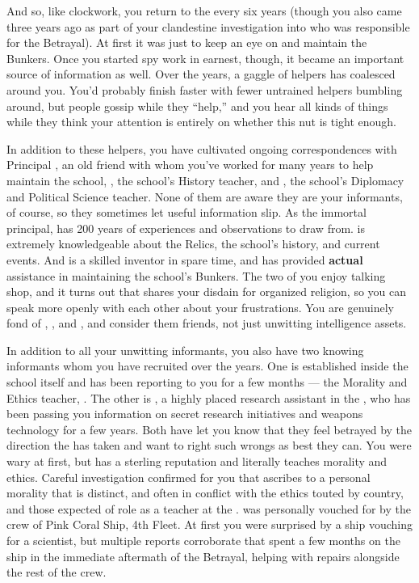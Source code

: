 \documentclass[char]{GL2020}
\begin{document}
And so, like clockwork, you return to the \pSchool{} every six years (though you also came three years ago as part of your clandestine investigation into who was responsible for the Betrayal). At first it was just to keep an eye on and maintain the Bunkers. Once you started spy work in earnest, though, it became an important source of information as well. Over the years, a gaggle of helpers has coalesced around you. You'd probably finish faster with fewer untrained helpers bumbling around, but people gossip while they ``help,'' and you hear all kinds of things while they think your attention is entirely on whether this nut is tight enough. 

In addition to these helpers, you have cultivated ongoing correspondences with Principal \cPrincipal{\full}, an old friend with whom you've worked for many years to help maintain the school, \cHistory{\full}, the school's History teacher, and \cChupInventor{\full}, the school’s Diplomacy and Political Science teacher. None of them are aware they are your informants, of course, so they sometimes let useful information slip. As the immortal principal, \cPrincipal{} has 200 years of experiences and observations to draw from. \cHistory{} is extremely knowledgeable about the Relics, the school's history, and current events. And \cChupInventor{} is a skilled inventor in \cChupInventor{\their} spare time, and has provided \textbf{actual} assistance in maintaining the school’s Bunkers. The two of you enjoy talking shop, and it turns out that \cChupInventor{} shares your disdain for organized religion, so you can speak more openly with each other about your frustrations. You are genuinely fond of \cPrincipal{}, \cHistory{}, and \cChupInventor{}, and consider them friends, not just unwitting intelligence assets. 

In addition to all your unwitting informants, you also have two knowing informants whom you have recruited over the years. One is established inside the school itself and has been reporting to you for a few months — the Morality and Ethics teacher, \cEthics{\full}. The other is \cAssistantScientist{\full}, a highly placed research assistant in the \pTech{}, who has been passing you information on secret research initiatives and weapons technology for a few years. Both have let you know that they feel betrayed by the direction the \pTech{} has taken and want to right such wrongs as best they can. You were wary at first, but \cEthics{} has a sterling reputation and literally teaches morality and ethics. Careful investigation confirmed for you that \cEthics{} ascribes to a personal morality that is distinct, and often in conflict with the ethics touted by \cEthics{\their} country, and those expected of \cEthics{\their} role as a teacher at the \pSc{}. \cAssistantScientist{} was personally vouched for by the crew of Pink Coral Ship, 4th Fleet. At first you were surprised by a \pShippie{} ship vouching for a \pTech{} scientist, but multiple reports corroborate that \cAssistantScientist{\they} spent a few months on the ship in the immediate aftermath of the Betrayal, helping with repairs alongside the rest of the crew.
\end{document}
